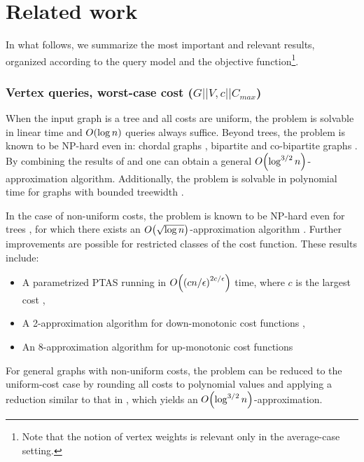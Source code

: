 \section{Related work}\label{relatedwork}
In what follows, we summarize the most important and relevant results, 
organized according to the query model and the objective function\footnote{Note that the notion of vertex weights is relevant only in the average-case setting.}.
\subsubsection{Vertex queries, worst-case cost ($G||V,c||C_{max}$)}
When the input graph is a tree and all costs are uniform, the problem is solvable in linear time \cite{Schaffer1989OptNodeRankOfTsInLinTime,OnakParys2006GenOfBSSInTsAndFLikePosets} and $O\mathopen{}\left( \log n \right)$ queries always suffice. Beyond trees, the problem is known to be NP-hard even in: chordal graphs \cite{DereniowskiVxRankOfChGsAndWTs}, bipartite and co-bipartite graphs \cite{RankingsofGraphs}. By combining the results of \cite{BODLAENDER1995238} and \cite{Improvedapproximationalgorithmsvertexseparators} one can obtain a general $O\mathopen{}\left( \log^{3/2}n \right)$-approximation algorithm. Additionally, the problem is solvable in polynomial time for graphs with bounded treewidth \cite{RankingsofGraphs}. 

In the case of non-uniform costs, the problem is known to be NP-hard even for trees 
\cite{Dereniowski2009ERankOfWTs,Cicalese2012BinIdentPForWTs,Cicalese2016OnTSPwNonUniCost}, 
for which there exists an $O\mathopen{}\left( \sqrt{\log n} \right)$-approximation algorithm 
\cite{dereniowski2017ApproxSsForGeneralBSinWTs}. 
Further improvements are possible for restricted classes of the cost function. 
These results include:
\begin{itemize}
    \item A parametrized PTAS running in $O\mathopen{}\left( \mathopen{}\left( cn/\epsilon \right)^{2c/\epsilon} \right)$ time, where $c$ is the largest cost \cite{DereniowskiVxRankOfChGsAndWTs}, 
    \item A 2-approximation algorithm for down-monotonic cost functions \cite{dereniowski2022CFApproxAlgForBSInTsWithMonoQTimes},
    \item An 8-approximation algorithm for up-monotonic cost functions \cite{dereniowski2022CFApproxAlgForBSInTsWithMonoQTimes,dereniowski2024SInTsMonoQTs}
\end{itemize}


For general graphs with non-uniform costs, the problem can be reduced to the uniform-cost case 
by rounding all costs to polynomial values and applying a reduction similar to that in 
\cite{DereniowskiVxRankOfChGsAndWTs}, which yields an $O\mathopen{}\left( \log^{3/2} n \right)$-approximation.

